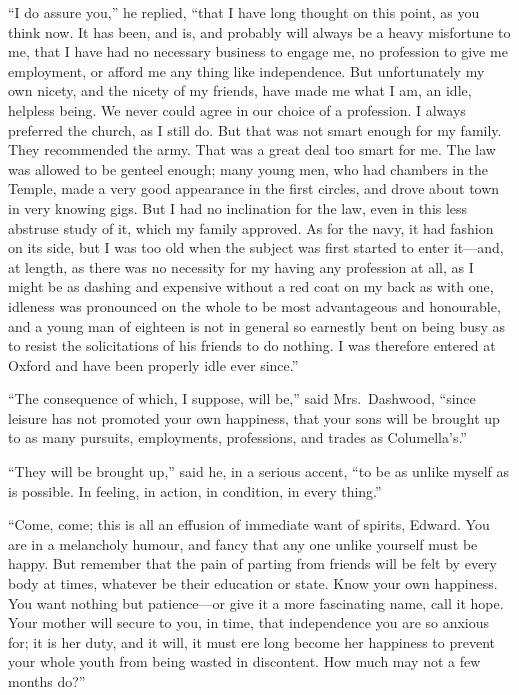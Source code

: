 \documentclass{article}
\begin{document}
``I do assure you,'' he replied, ``that I have long
thought on this point, as you think now.  It has been,
and is, and probably will always be a heavy misfortune
to me, that I have had no necessary business to engage me,
no profession to give me employment, or afford me any
thing like independence.  But unfortunately my own nicety,
and the nicety of my friends, have made me what I am,
an idle, helpless being.  We never could agree in our
choice of a profession.  I always preferred the church,
as I still do.  But that was not smart enough for my family.
They recommended the army.  That was a great deal
too smart for me.  The law was allowed to be genteel
enough; many young men, who had chambers in the Temple,
made a very good appearance in the first circles,
and drove about town in very knowing gigs.  But I had
no inclination for the law, even in this less abstruse
study of it, which my family approved.  As for the navy,
it had fashion on its side, but I was too old when the
subject was first started to enter it---and, at length,
as there was no necessity for my having any profession
at all, as I might be as dashing and expensive without
a red coat on my back as with one, idleness was pronounced
on the whole to be most advantageous and honourable,
and a young man of eighteen is not in general so earnestly
bent on being busy as to resist the solicitations of his
friends to do nothing.  I was therefore entered at Oxford
and have been properly idle ever since.''

``The consequence of which, I suppose, will be,''
said Mrs.\ Dashwood, ``since leisure has not promoted
your own happiness, that your sons will be brought up
to as many pursuits, employments, professions, and trades
as Columella's.''

``They will be brought up,'' said he, in a serious accent,
``to be as unlike myself as is possible.  In feeling,
in action, in condition, in every thing.''

``Come, come; this is all an effusion of immediate
want of spirits, Edward.  You are in a melancholy humour,
and fancy that any one unlike yourself must be happy.
But remember that the pain of parting from friends
will be felt by every body at times, whatever be their
education or state.  Know your own happiness.  You want
nothing but patience---or give it a more fascinating name,
call it hope.  Your mother will secure to you, in time,
that independence you are so anxious for; it is her duty,
and it will, it must ere long become her happiness to
prevent your whole youth from being wasted in discontent.
How much may not a few months do?''
\end{document}
